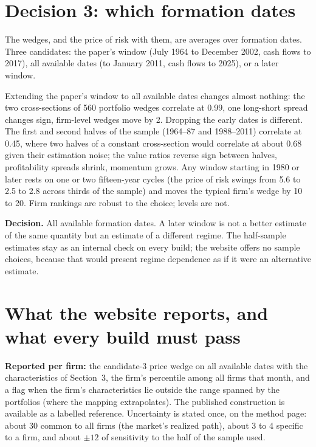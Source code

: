 \documentclass[11pt]{article}
\begin{document}
\section{Decision 3: which formation dates}

The wedges, and the price of risk with them, are averages over formation
dates. Three candidates: the paper's window (July 1964 to December 2002,
cash flows to 2017), all available dates (to January 2011, cash flows to
2025), or a later window.

Extending the paper's window to all available dates changes almost nothing:
the two cross-sections of 560 portfolio wedges correlate at 0.99, one
long-short spread changes sign, firm-level wedges move by 2\pp. Dropping the
early dates is different. The first and second halves of the sample
(1964--87 and 1988--2011) correlate at 0.45, where two halves of a constant
cross-section would correlate at about 0.68 given their estimation noise;
the value ratios reverse sign between halves, profitability spreads shrink,
momentum grows. Any window starting in 1980 or later rests on one or two
fifteen-year cycles (the price of risk swings from 5.6 to 2.5 to 2.8 across
thirds of the sample) and moves the typical firm's wedge by 10 to 20\pp.
Firm rankings are robust to the choice; levels are not.

\textbf{Decision.} All available formation dates. A later window is not a
better estimate of the same quantity but an estimate of a different regime.
The half-sample estimates stay as an internal check on every build; the
website offers no sample choices, because that would present regime
dependence as if it were an alternative estimate.

\section{What the website reports, and what every build must pass}

\textbf{Reported per firm:} the candidate-3 price wedge on all available
dates with the characteristics of Section~3, the firm's percentile among all
firms that month, and a flag when the firm's characteristics lie outside the
range spanned by the portfolios (where the mapping extrapolates). The
published construction is available as a labelled reference. Uncertainty is
stated once, on the method page: about 30\pp{} common to all firms (the
market's realized path), about 3 to 4\pp{} specific to a firm, and about
$\pm12$\pp{} of sensitivity to the half of the sample used.
\end{document}
